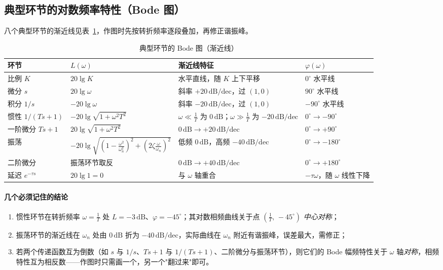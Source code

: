 \subsection{典型环节的对数频率特性（Bode 图）}
八个典型环节的渐近线见表~\ref{tab:bodelink}，作图时先按转折频率逐段叠加，再修正谐振峰。
\begin{table}[htbp]
\centering
\caption{典型环节的 Bode 图（渐近线）}\label{tab:bodelink}
\begin{tabular}{llll}
\toprule
环节 & $L(\omega)$ & 渐近线特征 & $\varphi(\omega)$ \\
\midrule
比例 $K$ & $20\lg K$ & 水平直线，随 $K$ 上下平移 & $0^\circ$ 水平线 \\
微分 $s$ & $20\lg\omega$ & 斜率 $+20\,\mathrm{dB/dec}$，过 $(1,0)$ & $90^\circ$ 水平线 \\
积分 $1/s$ & $-20\lg\omega$ & 斜率 $-20\,\mathrm{dB/dec}$，过 $(1,0)$ & $-90^\circ$ 水平线 \\
惯性 $1/(Ts+1)$ & $-20\lg\sqrt{1+\omega^2T^2}$ & $\omega\ll\frac1T$ 为 $0\,\mathrm{dB}$；$\omega\gg\frac1T$ 为 $-20\,\mathrm{dB/dec}$ & $0^\circ\to-90^\circ$ \\
一阶微分 $Ts+1$ & $20\lg\sqrt{1+\omega^2T^2}$ & $0\,\mathrm{dB}\to+20\,\mathrm{dB/dec}$ & $0^\circ\to+90^\circ$ \\
振荡 & $-20\lg\sqrt{\left(1-\frac{\omega^2}{\omega_n^2}\right)^2+\left(2\zeta\frac{\omega}{\omega_n}\right)^2}$ & 低频 $0\,\mathrm{dB}$，高频 $-40\,\mathrm{dB/dec}$ & $0^\circ\to-180^\circ$ \\
二阶微分 & 振荡环节取反 & $0\,\mathrm{dB}\to+40\,\mathrm{dB/dec}$ & $0^\circ\to+180^\circ$ \\
延迟 $e^{-\tau s}$ & $20\lg1=0$ & 与 $\omega$ 轴重合 & $-\tau\omega$，随 $\omega$ 线性下降 \\
\bottomrule
\end{tabular}
\end{table}

\paragraph{几个必须记住的结论}
\begin{enumerate}
    \item 惯性环节在转折频率 $\omega=\frac1T$ 处 $L=-3\,\mathrm{dB}$、$\varphi=-45^\circ$；其对数相频曲线关于点 $\left(\frac1T,\,-45^\circ\right)$ \emph{中心对称}；
    \item 振荡环节的渐近线在 $\omega_n$ 处由 $0\,\mathrm{dB}$ 折为 $-40\,\mathrm{dB/dec}$，实际曲线在 $\omega_n$ 附近有谐振峰，误差最大，需修正；
    \item 若两个传递函数互为倒数（如 $s$ 与 $1/s$、$Ts+1$ 与 $1/(Ts+1)$、二阶微分与振荡环节），则它们的 Bode 幅频特性关于 $\omega$ 轴\emph{对称}，相频特性互为相反数——作图时只需画一个，另一个"翻过来"即可。
\end{enumerate}

